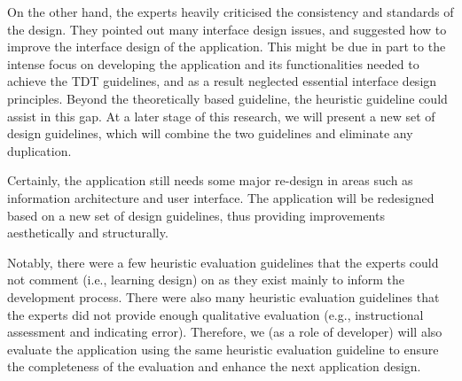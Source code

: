 On the other hand, the experts heavily criticised the consistency and standards of the design. They pointed out many interface design issues, and suggested how to improve the interface design of the application. This might be due in part to the intense focus on developing the application and its functionalities needed to achieve the TDT guidelines, and as a result neglected essential interface design principles. Beyond the theoretically based guideline, the heuristic guideline could assist in this gap. At a later stage of this research, we will present a new set of design guidelines, which will combine the two guidelines and eliminate any duplication.

Certainly, the application still needs some major re-design in areas such as information architecture and user interface. The application will be redesigned based on a new set of design guidelines, thus providing improvements aesthetically and structurally.

Notably, there were a few heuristic evaluation guidelines that the experts could not comment (i.e., learning design) on as they exist mainly to inform the development process. There were also many heuristic evaluation guidelines that the experts did not provide enough qualitative evaluation (e.g., instructional assessment and indicating error). Therefore, we (as a role of developer) will also evaluate the application using the same heuristic evaluation guideline to ensure the completeness of the evaluation and enhance the next application design. 

























